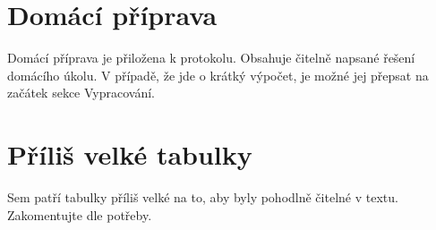 

%
\section{Domácí příprava}
	Domácí příprava je přiložena k protokolu. Obsahuje čitelně napsané řešení domácího úkolu. V případě, že jde o krátký výpočet, je možné jej přepsat na začátek sekce Vypracování.
	

\section{Příliš velké tabulky}
 Sem patří tabulky příliš velké na to, aby byly pohodlně čitelné v textu. Zakomentujte dle potřeby.


 
			
